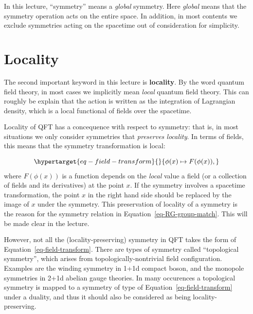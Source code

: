\documentclass[
  letterpaper,
  DIV=11,
  numbers=noendperiod]{scrreport}
\begin{document}
\begin{tcolorbox}[enhanced jigsaw, colback=white, toprule=.15mm, left=2mm, coltitle=black, opacityback=0, colbacktitle=quarto-callout-note-color!10!white, rightrule=.15mm, breakable, toptitle=1mm, titlerule=0mm, colframe=quarto-callout-note-color-frame, bottomtitle=1mm, title=\textcolor{quarto-callout-note-color}{\faInfo}\hspace{0.5em}{\textsf{Terminology}}, bottomrule=.15mm, opacitybacktitle=0.6, arc=.35mm, leftrule=.75mm]

In this lecture, ``symmetry'' means a \emph{global} symmetry. Here
\emph{global} means that the symmetry operation acts on the entire
space. In addition, in most contents we exclude symmetries acting on the
spacetime out of consideration for simplicity.

\end{tcolorbox}

\hypertarget{locality}{%
\section{Locality}\label{locality}}

The second important keyword in this lecture is \textbf{locality}. By
the word quantum field theory, in most cases we implicitly mean
\emph{local} quantum field theory. This can roughly be explain that the
action is written as the integration of Lagrangian density, which is a
local functional of fields over the spacetime.

Locality of QFT has a concequence with respect to symmetry: that is, in
most situations we only consider symmetries that \emph{preserves
locality}. In terms of fields, this means that the symmetry
transformation is local:

\begin{equation}\protect\hypertarget{eq-field-transform}{}{
\phi(x) \mapsto F(\phi(x)),
}\label{eq-field-transform}\end{equation} where \(F(\phi(x))\) is a
function depends on the \emph{local} value a field (or a collection of
fields and its derivatives) at the point \(x\). If the symmetry involves
a spacetime transformation, the point \(x\) in the right hand side
should be replaced by the image of \(x\) under the symmetry. This
preservation of locality of a symmetry is the reason for the symmetry
relation in Equation~\ref{eq-RG-group-match}. This will be made clear in
the lecture.

However, not all the (locality-preserving) symmetry in QFT takes the
form of Equation~\ref{eq-field-transform}. There are types of symmetry
called ``topological symmetry'', which arises from
topologically-nontrivial field configuration. Examples are the winding
symmetry in 1+1d compact boson, and the monopole symmetries in 2+1d
abelian gauge theories. In many occurences a topological symmetry is
mapped to a symmetry of type of Equation~\ref{eq-field-transform} under
a duality, and thus it should also be considered as being
locality-preserving.
\end{document}
